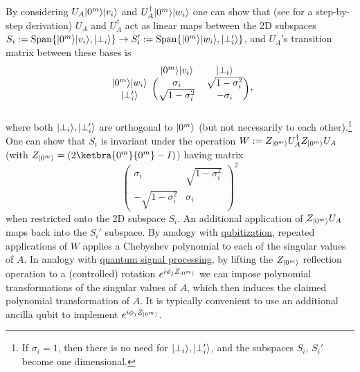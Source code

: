 \begin{refsection}
By considering $U_A \lvert0^m\rangle \lvert v_i\rangle$ and $U_A^\dagger \lvert0^m\rangle\lvert w_i\rangle$ one can show that (see \cite{lin2022LectureNotes} for a step-by-step derivation) $U_A$ and $U_A^\dagger$ act as linear maps between the 2D subspaces $S_i:=\mathrm{Span}\{\lvert0^m\rangle\lvert v_i\rangle,\lvert\perp_i\rangle\} \rightarrow S_i':=\mathrm{Span}\{\lvert0^m\rangle\lvert w_i\rangle,\lvert\perp_i'\rangle\}$, and $U_A$'s transition matrix between these bases is
\begin{align}\label{eq:SVD2D}
\begin{blockarray}{ccc}
& \ket{0^m} \ket{v_i} & \ket{\perp_i} \\
\begin{block}{c(cc)}
  \ket{0^m} \ket{w_i} & \sigma_i & \sqrt{1-\sigma_i^2} \\
  \ket{\perp_i'} & \sqrt{1-\sigma_i^2}& -\sigma_i \\
\end{block}
\end{blockarray}\,,
\end{align}
where both $\lvert\perp_i\rangle, \lvert\perp_i'\rangle$ are orthogonal to $\lvert0^m\rangle$ (but not necessarily to each other).\footnote{If $\sigma_i=1$, then there is no need for $\lvert\perp_i\rangle, \lvert\perp_i'\rangle$, and the subspaces $S_i$, $S_i'$ become one dimensional.} One can show that $S_i$ is invariant under the operation $W := Z_{\lvert0^m\rangle} U_A^\dag Z_{\lvert0^m\rangle} U_A $ (with $Z_{\ket{0^m}} = (2\ketbra{0^m}{0^m} - I)$) having matrix
\begin{equation*}
\left(\begin{array}{cc} \sigma_i & \sqrt{1-\sigma_i^2} \\ - \sqrt{1-\sigma_i^2} & \sigma_i \end{array}\right)^{\!\!2}
\end{equation*}
when restricted onto the 2D subspace $S_i$. An additional application of $ Z_{\lvert0^m\rangle} U_A$ maps back into the $S_i'$ subspace. By analogy with \hyperref[prim:Qubitization]{qubitization}, repeated applications of $W$ applies a Chebyshev polynomial to each of the singular values of $A$. In analogy with \hyperref[prim:QSP]{quantum signal processing}, by lifting the $Z_{\lvert0^m\rangle}$ reflection operation to a (controlled) rotation $e^{i\phi_j Z_{\lvert0^m\rangle}}$ we can impose polynomial transformations of the singular values of $A$, which then induces the claimed polynomial transformation of $A$. It is typically convenient to use an additional ancilla qubit to implement $e^{i\phi_j Z_{\lvert0^m\rangle}}$.


\end{refsection}
